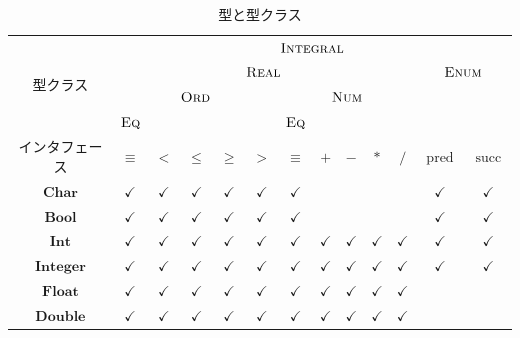\documentclass[a4paper,twocolumn]{jsbook}
\newcommand{\mSpecialFunc}[1]{\mathrm{#1}}
\DeclareMathOperator{\mPred}{\mSpecialFunc{pred}}
\DeclareMathOperator{\mSucc}{\mSpecialFunc{succ}}
\newcommand{\mType}[1]{\mathbf{#1}}
\newcommand{\mBoolType}{\mType{Bool}}
\newcommand{\mCharType}{\mType{Char}}
\newcommand{\mFloatType}{\mType{Float}}
\newcommand{\mDoubleType}{\mType{Double}}
\newcommand{\mIntType}{\mType{Int}}
\newcommand{\mIntegerType}{\mType{Integer}}
\newcommand{\mGenericTypeClass}[1]{\textsc{#1}} %
\newcommand{\mEnumTypeClass}{\mGenericTypeClass{Enum}}
\newcommand{\mEqTypeClass}{\mGenericTypeClass{Eq}}
\newcommand{\mIntegralTypeClass}{\mGenericTypeClass{Integral}}
\newcommand{\mNumTypeClass}{\mGenericTypeClass{Num}}
\newcommand{\mOrdTypeClass}{\mGenericTypeClass{Ord}}
\newcommand{\mRealTypeClass}{\mGenericTypeClass{Real}}
\begin{document}
\begin{table}
\caption{型と型クラス}
\label{tab:type-and-typeclass}
\begin{center}
\begin{tabular}{||c||c|c|c|c|c|c|c|c|c|c|c|c||}
\hline
\multirow{4}{*}{型クラス}
    &\multicolumn{12}{|c||}{$\mIntegralTypeClass$}\\
\cline{2-13}
\multirow{3}{*}{}
    &\multicolumn{10}{|c|}{$\mRealTypeClass$}
    &\multicolumn{2}{|c||}{$\mEnumTypeClass$}\\
\cline{2-11}
\multirow{2}{*}{}
    &\multicolumn{5}{|c|}{$\mOrdTypeClass$}
    &\multicolumn{5}{|c|}{$\mNumTypeClass$}
    &\multicolumn{2}{|c||}{ }\\
\cline{2-2}\cline{7-7}
{ }
    &$\mEqTypeClass$
    &\multicolumn{4}{|c|}{ }
    &$\mEqTypeClass$
    &\multicolumn{4}{|c|}{ }
    &\multicolumn{2}{|c||}{ }\\
\hline
インタフェース
    &$\equiv$
    &$<$
    &$\le$
    &$\ge$
    &$>$
    &$\equiv$
    &$+$
    &$-$
    &$*$
    &$/$
    &$\mPred$
    &$\mSucc$\\
\hline\hline
$\mCharType$
    &$\checkmark$
    &$\checkmark$
    &$\checkmark$
    &$\checkmark$
    &$\checkmark$
    &$\checkmark$
    &
    &
    &
    &
    &$\checkmark$
    &$\checkmark$\\
\hline
$\mBoolType$
    &$\checkmark$
    &$\checkmark$
    &$\checkmark$
    &$\checkmark$
    &$\checkmark$
    &$\checkmark$
    &
    &
    &
    &
    &$\checkmark$
    &$\checkmark$\\
\hline
$\mIntType$
    &$\checkmark$
    &$\checkmark$
    &$\checkmark$
    &$\checkmark$
    &$\checkmark$
    &$\checkmark$
    &$\checkmark$
    &$\checkmark$
    &$\checkmark$
    &$\checkmark$
    &$\checkmark$
    &$\checkmark$\\
\hline
$\mIntegerType$
    &$\checkmark$
    &$\checkmark$
    &$\checkmark$
    &$\checkmark$
    &$\checkmark$
    &$\checkmark$
    &$\checkmark$
    &$\checkmark$
    &$\checkmark$
    &$\checkmark$
    &$\checkmark$
    &$\checkmark$\\
\hline
$\mFloatType$
    &$\checkmark$
    &$\checkmark$
    &$\checkmark$
    &$\checkmark$
    &$\checkmark$
    &$\checkmark$
    &$\checkmark$
    &$\checkmark$
    &$\checkmark$
    &$\checkmark$
    &
    &\\
\hline
$\mDoubleType$
    &$\checkmark$
    &$\checkmark$
    &$\checkmark$
    &$\checkmark$
    &$\checkmark$
    &$\checkmark$
    &$\checkmark$
    &$\checkmark$
    &$\checkmark$
    &$\checkmark$
    &
    &\\
\hline
\end{tabular}
\end{center}
\end{table}
\end{document}
